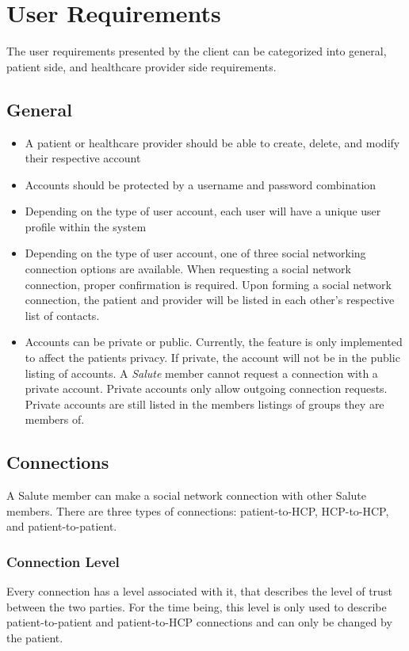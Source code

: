 \chapter{User Requirements}
The user requirements presented by the client can be categorized into general, patient side, and healthcare provider side requirements.

\section{General}
\begin{itemize}
\item A patient or healthcare provider should be able to create, delete, and modify their respective account
\item Accounts should be protected by a username and password combination
\item Depending on the type of user account, each user will have a unique user profile within the system
\item Depending on the type of user account, one of three social networking connection options are available. When requesting a social network connection, proper confirmation is required.  Upon forming a social network connection, the patient and provider will be listed in each other's respective list of contacts.
\item Accounts can be private or public. Currently, the feature is only implemented to affect the patients privacy. If private, the account will not be in the public listing of accounts. A \emph{Salute} member cannot request a connection with a private account. Private accounts only allow outgoing connection requests. Private accounts are still listed in the members listings of groups they are members of. 
\end{itemize} 

\section{Connections}
A Salute member can make a social network connection with other Salute members. There are three types of connections: patient-to-HCP, HCP-to-HCP, and patient-to-patient. 

\subsection{Connection Level}
Every connection has a level associated with it, that describes the level of trust between the two parties. For the time being, this level is only used to describe patient-to-patient and patient-to-HCP connections and can only be changed by the patient.

